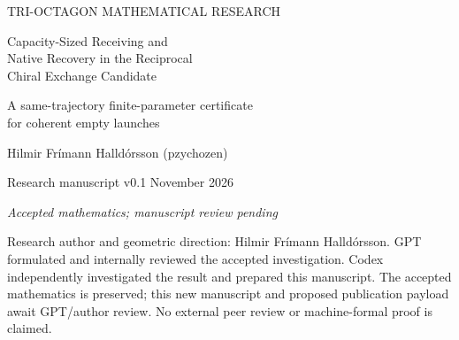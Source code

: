 \documentclass[11pt,a4paper]{article}
\numberwithin{equation}{section}
\begin{document}
\hypersetup{pageanchor=false}
\begin{titlepage}
\vspace*{2mm}
{\small\color{MidnightBlue} TRI-OCTAGON MATHEMATICAL RESEARCH\par}
\vspace{7mm}
{\LARGE\bfseries\raggedright Capacity-Sized Receiving and\\
Native Recovery in the Reciprocal\\Chiral Exchange Candidate\par}
\vspace{5mm}
{\large A same-trajectory finite-parameter certificate\\for coherent empty launches\par}
\vspace{6mm}
{\large Hilmir Fr\'imann Halld\'orsson (pzychozen)\par}
\vspace{3mm}
{Research manuscript v0.1 November 2026\par}
{\itshape Accepted mathematics; manuscript review pending\par}
\vspace{4mm}
\begin{abstract}
Finite-time access to the joint projection capacity of the reciprocal chiral exchange candidate does not by itself determine receiver allocation or later native recovery. We establish both on the same unchanged solution for the coherent empty launch $\Omega_0=(1,e^{i\phi},1)$, $0<\phi\le1/100$ radians, at yaw $\pi/4$. Fix finite positive coefficients before phase so that $\omega_R=\nu/3$ and $0<\gamma/\nu\le1/100$, with the rates defined in the original variables below. The admitted periodic carrier retains positive propagation and disjoint finite-width $H^1$ profiles. Writing $C=\alpha_N(1-\cos\phi)$ for the joint capacity and $\varpi=\sqrt{17/18}\,\nu$, the episode satisfies
\[
\begin{gathered}
 E_{\rm out}(1/\nu)>\frac{1053}{4096}C,\qquad
 H_R(\pi/\varpi)>C/4,\\
 H_C(\pi/\varpi)<C/100,\qquad
 E_{\rm out}(2\pi/\varpi)<C/100 .
\end{gathered}
\]
The first bound is inherited after checking the same coefficients. Net native recovery to $2\pi/\varpi$ exceeds $24/25$ of each actual intermediate external stock, at $1/\nu$ and $\pi/\varpi$, respectively. A complete moving-native tangent reference and a uniform finite error below $\sqrt{2C}/10$ prove the new stock bounds. The normalization is joint capacity, not the whole initial native store; absolute capacity tends to zero with phase. The equality-constrained sufficient family proves neither saturation, irreversible retention, monotonic recovery, an exact nonlinear period nor a spatial circuit.
\end{abstract}
\vfill
{\small Research author and geometric direction: Hilmir Fr\'imann Halld\'orsson.
GPT formulated and internally reviewed the accepted investigation.
Codex independently investigated the result and prepared this manuscript.
The accepted mathematics is preserved; this new manuscript and proposed publication payload await GPT/author review.
No external peer review or machine-formal proof is claimed.}
\end{titlepage}
\setcounter{page}{2}\hypersetup{pageanchor=true}










\clearpage
\appendix


\end{document}
